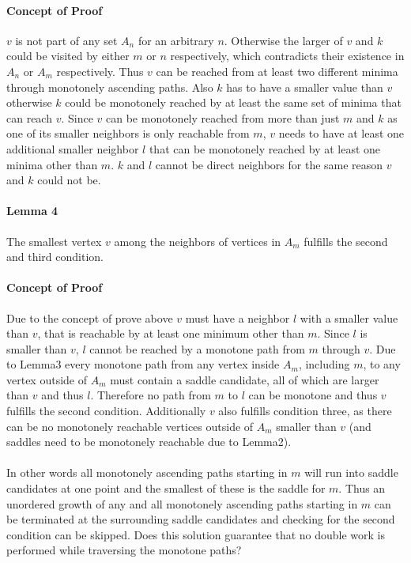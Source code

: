 \documentclass{scrartcl}
\begin{document}
\paragraph{Concept of Proof}
\(v\) is not part of any set \(A_n\) for an arbitrary \(n\). Otherwise the larger of \(v\) and \(k\) could be visited by either \(m\) or \(n\) respectively, which contradicts their existence in \(A_n\) or \(A_m\) respectively. Thus \(v\) can be reached from at least two different minima through monotonely ascending paths. Also \(k\) has to have a smaller value than \(v\) otherwise \(k\) could be monotonely reached by at least the same set of minima that can reach \(v\). Since \(v\) can be monotonely reached from more than just \(m\) and \(k\) as one of its smaller neighbors is only reachable from \(m\), \(v\) needs to have at least one additional smaller neighbor \(l\) that can be monotonely reached by at least one minima other than \(m\). \(k\) and \(l\) cannot be direct neighbors for the same reason \(v\) and \(k\) could not be.

\paragraph{Lemma 4} The smallest vertex \(v\) among the neighbors of vertices in \(A_m\) fulfills the second and third condition.

\paragraph{Concept of Proof}
Due to the concept of prove above \(v\) must have a neighbor \(l\) with a smaller value than \(v\), that is reachable by at least one minimum other than \(m\). Since \(l\) is smaller than \(v\), \(l\) cannot be reached by a monotone path from \(m\) through \(v\). Due to Lemma3 every monotone path from any vertex inside \(A_m\), including \(m\), to any vertex outside of \(A_m\) must contain a saddle candidate, all of which are larger than \(v\) and thus \(l\). Therefore no path from \(m\) to \(l\) can be monotone and thus \(v\) fulfills the second condition. Additionally \(v\) also fulfills condition three, as there can be no monotonely reachable vertices outside of \(A_m\) smaller than \(v\) (and saddles need to be monotonely reachable due to Lemma2).

\paragraph{}
In other words all monotonely ascending paths starting in \(m\) will run into saddle candidates at one point and the smallest of these is the saddle for \(m\). Thus an unordered growth of any and all monotonely ascending paths starting in \(m\) can be terminated at the surrounding saddle candidates and checking for the second condition can be skipped. Does this solution guarantee that no double work is performed while traversing the monotone paths?
  
\end{document}
